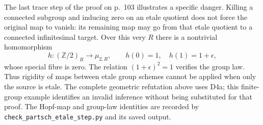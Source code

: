 The last trace step of the proof on p.~103 illustrates a
specific danger. Killing a connected subgroup and inducing
zero on an etale quotient does not force the original map to
vanish: its remaining map may go from that etale quotient to
a connected infinitesimal target. Over this very $R$ there
is a nontrivial homomorphism
\[
 h:(\mathbb Z/2)_R\longrightarrow\mu_{2,R},\qquad
 h(0)=1,\quad h(1)=1+\epsilon,
\]
whose special fibre is zero. The relation
$(1+\epsilon)^2=1$ verifies the group law. Thus rigidity of
maps between etale group schemes cannot be applied when
only the source is etale. The complete geometric refutation
above uses D4a; this finite-group example identifies an
invalid inference without being substituted for that proof.
The Hopf-map and group-law identities are recorded by
\texttt{check\_partsch\_etale\_step.py} and its saved output.
